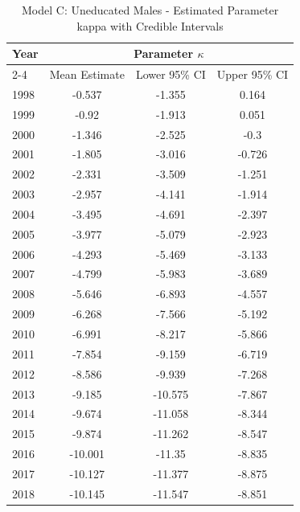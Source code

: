 \begin{landscape}
\begin{table}[htbp]
\centering
\caption{Model C: Uneducated Males - Estimated Parameter kappa  with Credible Intervals}
\label{tab:parameters_k21}
\begin{tabular}{@{}lccc@{}}
\toprule
Year & \multicolumn{3}{c}{Parameter \(\kappa\)} \\
\cmidrule(lr){2-4}
      & Mean Estimate & Lower 95\% CI & Upper 95\% CI \\
\midrule
1998 & -0.537 & -1.355 & 0.164 \\
1999 & -0.92 & -1.913 & 0.051 \\
2000 & -1.346 & -2.525 & -0.3 \\
2001 & -1.805 & -3.016 & -0.726 \\
2002 & -2.331 & -3.509 & -1.251 \\
2003 & -2.957 & -4.141 & -1.914 \\
2004 & -3.495 & -4.691 & -2.397 \\
2005 & -3.977 & -5.079 & -2.923 \\
2006 & -4.293 & -5.469 & -3.133 \\
2007 & -4.799 & -5.983 & -3.689 \\
2008 & -5.646 & -6.893 & -4.557 \\
2009 & -6.268 & -7.566 & -5.192 \\
2010 & -6.991 & -8.217 & -5.866 \\
2011 & -7.854 & -9.159 & -6.719 \\
2012 & -8.586 & -9.939 & -7.268 \\
2013 & -9.185 & -10.575 & -7.867 \\
2014 & -9.674 & -11.058 & -8.344 \\
2015 & -9.874 & -11.262 & -8.547 \\
2016 & -10.001 & -11.35 & -8.835 \\
2017 & -10.127 & -11.377 & -8.875 \\
2018 & -10.145 & -11.547 & -8.851 \\
\bottomrule
\end{tabular}
\end{table}
\end{landscape}